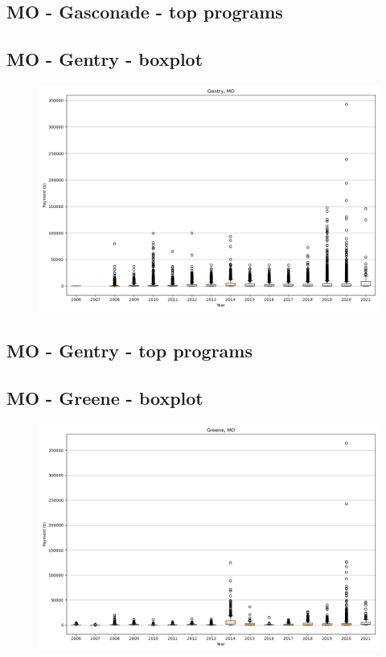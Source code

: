 \subsection*{MO - Gasconade - top programs}

\newpage
\subsection*{MO - Gentry - boxplot}
\begin{figure}[h]
\centering
\includegraphics[width=7in]{../output/boxplots/counties/Gentry-MO_boxplot.png}
\end{figure}


\subsection*{MO - Gentry - top programs}

\newpage
\subsection*{MO - Greene - boxplot}
\begin{figure}[h]
\centering
\includegraphics[width=7in]{../output/boxplots/counties/Greene-MO_boxplot.png}
\end{figure}


